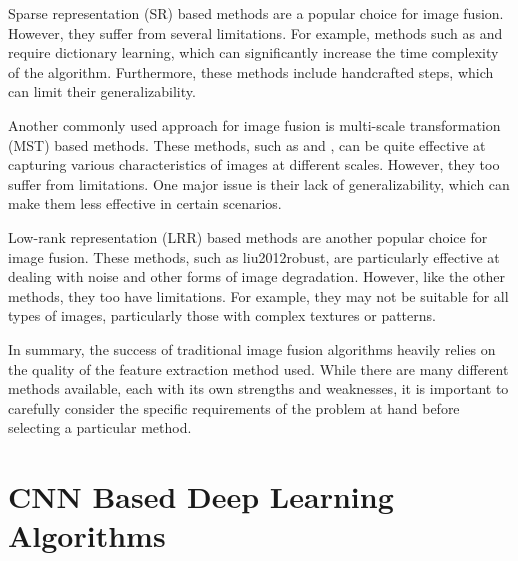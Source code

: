Sparse representation (SR) based methods are a popular choice for image fusion. However, they suffer from several limitations. For example, methods such as \cite{bin2016efficient} and \cite{zhang2013dictionary} require dictionary learning, which can significantly increase the time complexity of the algorithm. Furthermore, these methods include handcrafted steps, which can limit their generalizability.

Another commonly used approach for image fusion is multi-scale transformation (MST) based methods. These methods, such as \cite{hu2017adaptive} and \cite{hu2017adaptive}, can be quite effective at capturing various characteristics of images at different scales. However, they too suffer from limitations. One major issue is their lack of generalizability, which can make them less effective in certain scenarios.

Low-rank representation (LRR) based methods are another popular choice for image fusion. These methods, such as \cite{text}{liu2012robust}, are particularly effective at dealing with noise and other forms of image degradation. However, like the other methods, they too have limitations. For example, they may not be suitable for all types of images, particularly those with complex textures or patterns.

In summary, the success of traditional image fusion algorithms heavily relies on the quality of the feature extraction method used. While there are many different methods available, each with its own strengths and weaknesses, it is important to carefully consider the specific requirements of the problem at hand before selecting a particular method.

\section{CNN Based Deep Learning Algorithms}
